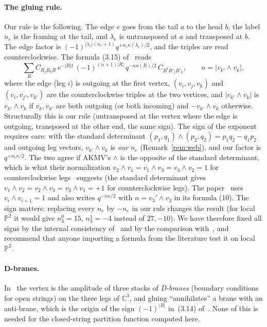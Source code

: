 \documentclass[11pt]{article}
\theoremstyle{plain}
\theoremstyle{definition}
\theoremstyle{remark}
\newcommand{\C}{\mathbb{C}}
\newcommand{\PP}{\mathbb{P}}
\newcommand{\tr}{{\mathsf t}}
\newcommand{\lt}[1]{#1^{\tr}}
\begin{document}
\paragraph{The gluing rule.} Our rule is the following. The edge $e$ goes from the tail $a$ to
the head $b$, the label $n_e$ is the framing at the tail, and $\lambda_e$ is untransposed at $a$
and transposed at $b$. The edge factor is $(-1)^{|\lambda_e|(n_e+1)}q^{+n_e\kappa(\lambda_e)/2}$,
and the triples are read counterclockwise. The formula (3.15) of~\cite{AKMV} reads
\begin{equation}
\sum_R C_{R_jR_kR}\,e^{-|R|t}\,(-1)^{(n+1)|R|}\,q^{-n\kappa(R)/2}\,C_{\lt R R'_jR'_k},\qquad
n=|v_{k'}\wedge v_k|,
\end{equation}
where the edge (leg $i$) is outgoing at the first vertex, $(v_i,v_j,v_k)$ and $(v_i,v_{j'},v_{k'})$
are the counterclockwise triples at the two vertices, and $|v_{k'}\wedge v_k|$ is
$v_{k'}\wedge v_k$ if $v_k,v_{k'}$ are both outgoing (or both incoming) and $-v_{k'}\wedge v_k$
otherwise. Structurally this is our rule (untransposed at the vertex where the edge is
outgoing, transposed at the other end, the same sign). The sign of the exponent requires care:
with the standard determinant $(p_1,q_1)\wedge(p_2,q_2)=p_1q_2-q_1p_2$ and outgoing leg vectors,
$v_{k'}\wedge v_k$ is \textit{our} $n_e$ (Remark~\ref{rem:web}), and our factor is
$q^{+n_e\kappa/2}$. The two agree if AKMV's $\wedge$ is the opposite of the standard determinant,
which is what their normalization $v_2\wedge v_1=v_1\wedge v_3=v_3\wedge v_2=1$ for
counterclockwise legs~\cite[\S3.4]{AKMV} suggests (the standard determinant gives
$v_1\wedge v_2=v_2\wedge v_3=v_3\wedge v_1=+1$ for counterclockwise legs). The paper~\cite{IKP-strip} uses $v_i\wedge v_{i+1}=1$ and also writes $q^{-n\kappa/2}$ with
$n=v_3'\wedge v_3$ in its formula (10). The sign matters: replacing every $n_e$ by $-n_e$ in
our rule changes the result (for local $\PP^2$ it would give $n^0_3=15$, $n^1_3=-4$ instead of
$27,-10$). We have therefore fixed all signs by the internal consistency of~\cite{Kon} and by
the comparison with~\cite{KKV,CKYZ}, and recommend that anyone importing a formula from the
literature test it on local $\PP^2$.

\paragraph{D-branes.} In~\cite{AKMV} the vertex is the amplitude of three stacks of
\textit{D-branes} (boundary conditions for open strings) on the three legs of $\C^3$, and
gluing ``annihilates'' a brane with an anti-brane, which is the origin of the sign
$(-1)^{|R|}$ in~(3.14) of~\cite{AKMV}. None of this is needed for the closed-string partition
function computed here.
\end{document}

